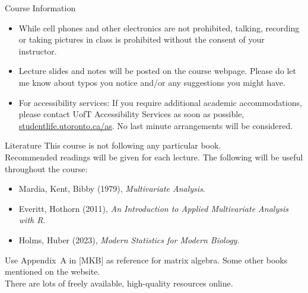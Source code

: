 \documentclass[11pt,handout,aspectratio=169]{beamer}
\begin{document}
\begin{frame}{Course Information}
  \begin{itemize}
  \item While cell phones and other electronics are not prohibited, talking, recording or taking pictures in class is prohibited without the consent of your instructor.
  \item {Lecture slides and notes will be posted on the course webpage.} Please do let me know about typos you notice and/or any suggestions you might have.
  \item For accessibility services: If you require additional academic accommodations, please contact UofT Accessibility Services as soon as possible, \url{studentlife.utoronto.ca/as}. No last minute arrangements will be considered.   
  \end{itemize}
\end{frame}




\begin{frame}[fragile]{Literature}
This course is not following any particular book. \\[2mm]
Recommended readings will be given for each lecture. The following will be useful throughout the course:
{\small\begin{itemize} 
\item Mardia, Kent, Bibby (1979), \textit{Multivariate Analysis}.
 \item  Everitt, Hothorn (2011), \textit{An Introduction to Applied Multivariate Analysis with R}. 
 \item Holms, Huber (2023), \textit{Modern Statistics for Modern Biology}.
\end{itemize}}
\bigskip 
Use Appendix~A in [MKB] as reference for matrix algebra.
\bigskip
Some other books mentioned on the website.\\

There are lots of freely available, high-quality resources online.

\end{frame}

\end{document}
